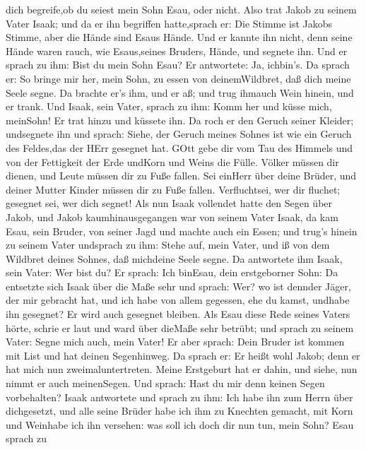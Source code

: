 dich begreife,ob du seiest mein Sohn Esau, oder nicht. 
Also trat Jakob zu seinem Vater Isaak; und da er ihn begriffen
hatte,sprach er: Die Stimme ist Jakobs Stimme, aber die Hände sind Esaus
Hände.  Und er kannte ihn nicht, denn seine Hände waren
rauch, wie Esaus,seines Bruders, Hände, und segnete ihn. 
Und er sprach zu ihm: Bist du mein Sohn Esau? Er antwortete: Ja,
ichbin's.  Da sprach er: So bringe mir her, mein Sohn, zu
essen von deinemWildbret, daß dich meine Seele segne. Da brachte er's
ihm, und er aß; und trug ihmauch Wein hinein, und er trank.
 Und Isaak, sein Vater, sprach zu ihm: Komm her und küsse
mich, meinSohn!  Er trat hinzu und küssete ihn. Da roch er
den Geruch seiner Kleider; undsegnete ihn und sprach: Siehe, der Geruch
meines Sohnes ist wie ein Geruch des Feldes,das der HErr gesegnet hat.
 GOtt gebe dir vom Tau des Himmels und von der Fettigkeit
der Erde undKorn und Weins die Fülle.  Völker müssen dir
dienen, und Leute müssen dir zu Fuße fallen. Sei einHerr über deine
Brüder, und deiner Mutter Kinder müssen dir zu Fuße fallen.
Verfluchtsei, wer dir fluchet; gesegnet sei, wer dich segnet!
 Als nun Isaak vollendet hatte den Segen über Jakob, und
Jakob kaumhinausgegangen war von seinem Vater Isaak, da kam Esau, sein
Bruder, von seiner Jagd  und machte auch ein Essen; und
trug's hinein zu seinem Vater undsprach zu ihm: Stehe auf, mein Vater,
und iß von dem Wildbret deines Sohnes, daß michdeine Seele segne.
 Da antwortete ihm Isaak, sein Vater: Wer bist du? Er
sprach: Ich binEsau, dein erstgeborner Sohn:  Da entsetzte
sich Isaak über die Maße sehr und sprach: Wer? wo ist dennder Jäger, der
mir gebracht hat, und ich habe von allem gegessen, ehe du kamst, undhabe
ihn gesegnet? Er wird auch gesegnet bleiben.  Als Esau
diese Rede seines Vaters hörte, schrie er laut und ward über dieMaße
sehr betrübt; und sprach zu seinem Vater: Segne mich auch, mein Vater!
 Er aber sprach: Dein Bruder ist kommen mit List und hat
deinen Segenhinweg.  Da sprach er: Er heißt wohl Jakob;
denn er hat mich nun zweimaluntertreten. Meine Erstgeburt hat er dahin,
und siehe, nun nimmt er auch meinenSegen. Und sprach: Hast du mir denn
keinen Segen vorbehalten?  Isaak antwortete und sprach zu
ihm: Ich habe ihn zum Herrn über dichgesetzt, und alle seine Brüder habe
ich ihm zu Knechten gemacht, mit Korn und Weinhabe ich ihn versehen: was
soll ich doch dir nun tun, mein Sohn?  Esau sprach zu
